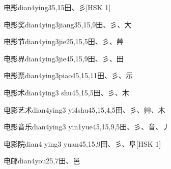 \begin{EntryWithPhonetic}{电影}{dian4ying3}{5,15}{⽥、⼺}[HSK 1]
\end{EntryWithPhonetic}

\begin{EntryWithPhonetic}{电影奖}{dian4ying3jiang3}{5,15,9}{⽥、⼺、⼤}
\end{EntryWithPhonetic}

\begin{EntryWithPhonetic}{电影节}{dian4ying3jie2}{5,15,5}{⽥、⼺、⾋}
\end{EntryWithPhonetic}

\begin{EntryWithPhonetic}{电影界}{dian4ying3jie4}{5,15,9}{⽥、⼺、⽥}
\end{EntryWithPhonetic}

\begin{EntryWithPhonetic}{电影票}{dian4ying3piao4}{5,15,11}{⽥、⼺、⽰}
\end{EntryWithPhonetic}

\begin{EntryWithPhonetic}{电影术}{dian4ying3 shu4}{5,15,5}{⽥、⼺、⽊}
\end{EntryWithPhonetic}

\begin{EntryWithPhonetic}{电影艺术}{dian4ying3 yi4shu4}{5,15,4,5}{⽥、⼺、⾋、⽊}
\end{EntryWithPhonetic}

\begin{EntryWithPhonetic}{电影音乐}{dian4ying3 yin1yue4}{5,15,9,5}{⽥、⼺、⾳、⼃}
\end{EntryWithPhonetic}

\begin{EntryWithPhonetic}{电影院}{dian4 ying3 yuan4}{5,15,9}{⽥、⼺、⾩}[HSK 1]
\end{EntryWithPhonetic}

\begin{EntryWithPhonetic}{电邮}{dian4you2}{5,7}{⽥、⾢}
\end{EntryWithPhonetic}

